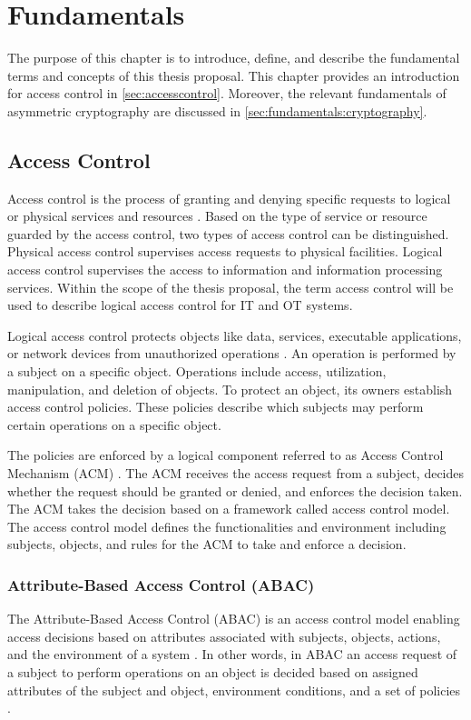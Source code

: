 \chapter{Fundamentals}
\label{ch:fundamentals}
The purpose of this chapter is to introduce, define, and describe the fundamental terms and concepts of this thesis proposal.
This chapter provides an introduction for access control in \autoref{sec:accesscontrol}.
Moreover, the relevant fundamentals of asymmetric cryptography are discussed in \autoref{sec:fundamentals:cryptography}.

\section{Access Control}
\label{sec:accesscontrol}
Access control is the process of granting and denying specific requests to logical or physical services and resources \cite{NIST2022}.
Based on the type of service or resource guarded by the access control, two types of access control can be distinguished.
Physical access control supervises access requests to physical facilities.
Logical access control supervises the access to information and information processing services.
Within the scope of the thesis proposal, the term access control will be used to describe logical access control for IT and OT systems.

Logical access control protects objects like data, services, executable applications, or network devices from unauthorized operations \cite{Hu2014}.
An operation is performed by a subject on a specific object.
Operations include access, utilization, manipulation, and deletion of objects.
To protect an object, its owners establish access control policies.
These policies describe which subjects may perform certain operations on a specific object.

The policies are enforced by a logical component referred to as Access Control Mechanism (ACM) \cite{Hu2014}.
The ACM receives the access request from a subject, decides whether the request should be granted or denied, and enforces the decision taken.
The ACM takes the decision based on a framework called access control model.
The access control model defines the functionalities and environment including subjects, objects, and rules for the ACM to take and enforce a decision.

\subsection{Attribute-Based Access Control (ABAC)}
The Attribute-Based Access Control (ABAC) is an access control model enabling access decisions based on attributes associated with subjects, objects, actions, and the environment of a system \cite{JTF2020}.
In other words, in ABAC an access request of a subject to perform operations on an object is decided based on assigned attributes of the subject and object, environment conditions, and a set of policies \cite{Hu2014}.

